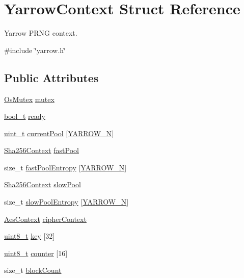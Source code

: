 \hypertarget{structYarrowContext}{}\section{Yarrow\+Context Struct Reference}
\label{structYarrowContext}


Yarrow P\+R\+NG context.  




{\ttfamily \#include \char`\"{}yarrow.\+h\char`\"{}}

\subsection*{Public Attributes}
\begin{DoxyCompactItemize}
\item 
\hyperlink{structOsMutex}{Os\+Mutex} \hyperlink{structYarrowContext_ad640562fce2921008b8e1203a04b45a7}{mutex}
\item 
\hyperlink{compiler__port_8h_a812d16e5494522586b3784e55d479912}{bool\+\_\+t} \hyperlink{structYarrowContext_a69811dc5b1ae10c287a3f6c7752d7c21}{ready}
\item 
\hyperlink{compiler__port_8h_a12a1e9b3ce141648783a82445d02b58d}{uint\+\_\+t} \hyperlink{structYarrowContext_ab70fd1773a6e3de3ab5be0149bb1d3f0}{current\+Pool} \mbox{[}\hyperlink{yarrow_8h_a26ee6536b9ff794ba4a21956c7dc44a5}{Y\+A\+R\+R\+O\+W\+\_\+N}\mbox{]}
\item 
\hyperlink{structSha256Context}{Sha256\+Context} \hyperlink{structYarrowContext_a0cc3cd3fb0c205a927a72c384ade1b29}{fast\+Pool}
\item 
size\+\_\+t \hyperlink{structYarrowContext_aa98934d1f80991748c2ae6ce898dee2c}{fast\+Pool\+Entropy} \mbox{[}\hyperlink{yarrow_8h_a26ee6536b9ff794ba4a21956c7dc44a5}{Y\+A\+R\+R\+O\+W\+\_\+N}\mbox{]}
\item 
\hyperlink{structSha256Context}{Sha256\+Context} \hyperlink{structYarrowContext_afa35e962f4269b12f40dfc3f93ea64c4}{slow\+Pool}
\item 
size\+\_\+t \hyperlink{structYarrowContext_a295ac4bb5a95ce6237ad0b6a9776eff9}{slow\+Pool\+Entropy} \mbox{[}\hyperlink{yarrow_8h_a26ee6536b9ff794ba4a21956c7dc44a5}{Y\+A\+R\+R\+O\+W\+\_\+N}\mbox{]}
\item 
\hyperlink{structAesContext}{Aes\+Context} \hyperlink{structYarrowContext_a20f7d783d0cbf6427551cd60f6a4b13d}{cipher\+Context}
\item 
\hyperlink{stdint_8h_aba7bc1797add20fe3efdf37ced1182c5}{uint8\+\_\+t} \hyperlink{structYarrowContext_af6ae1cbcaa5dd10f23acade23fb2b79c}{key} \mbox{[}32\mbox{]}
\item 
\hyperlink{stdint_8h_aba7bc1797add20fe3efdf37ced1182c5}{uint8\+\_\+t} \hyperlink{structYarrowContext_a38d6c27182707d79f9479a60934972ba}{counter} \mbox{[}16\mbox{]}
\item 
size\+\_\+t \hyperlink{structYarrowContext_a4884396418346045041cd7cf33e81082}{block\+Count}
\end{DoxyCompactItemize}


